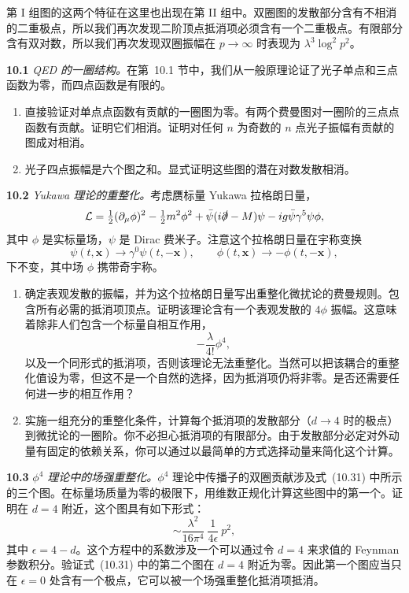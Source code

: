 第 I 组图的这两个特征在这里也出现在第 II 组中。双圈图的发散部分含有不相消的二重极点，所以我们再次发现二阶顶点抵消项必须含有一个二重极点。有限部分含有双对数，所以我们再次发现双圈振幅在 $p\to\infty$ 时表现为 $\lambda^3\log^2 p^2$。

\problems

\textbf{10.1} \emph{QED 的一圈结构。}在第~10.1 节中，我们从一般原理论证了光子单点和三点函数为零，而四点函数是有限的。
\begin{enumerate}[label=(\alph*)]
  \item 直接验证对单点点函数有贡献的一圈图为零。有两个费曼图对一圈阶的三点点函数有贡献。证明它们相消。证明对任何 $n$ 为奇数的 $n$ 点光子振幅有贡献的图成对相消。
  \item 光子四点振幅是六个图之和。显式证明这些图的潜在对数发散相消。
\end{enumerate}

\textbf{10.2} \emph{Yukawa 理论的重整化。}考虑赝标量 Yukawa 拉格朗日量，
\begin{equation}
  \mathcal{L} = \tfrac{1}{2}(\partial_\mu\phi)^2 - \tfrac{1}{2}m^2\phi^2
    + \bar{\psi}(i\slashed{\partial} - M)\psi - ig\bar{\psi}\gamma^5\psi\phi ,
\end{equation}
其中 $\phi$ 是实标量场，$\psi$ 是 Dirac 费米子。注意这个拉格朗日量在宇称变换
\begin{equation}
  \psi(t,\mathbf{x}) \to \gamma^0\psi(t,-\mathbf{x}),\qquad
  \phi(t,\mathbf{x}) \to -\phi(t,-\mathbf{x}),
\end{equation}
下不变，其中场 $\phi$ 携带奇宇称。
\begin{enumerate}[label=(\alph*)]
  \item 确定表观发散的振幅，并为这个拉格朗日量写出重整化微扰论的费曼规则。包含所有必需的抵消项顶点。证明该理论含有一个表观发散的 $4\phi$ 振幅。这意味着除非人们包含一个标量自相互作用，
    \begin{equation}
      -\frac{\lambda}{4!}\phi^4 ,
    \end{equation}
    以及一个同形式的抵消项，否则该理论无法重整化。当然可以把该耦合的重整化值设为零，但这不是一个自然的选择，因为抵消项仍将非零。是否还需要任何进一步的相互作用？
  \item 实施一组充分的重整化条件，计算每个抵消项的发散部分（$d\to 4$ 时的极点）到微扰论的一圈阶。你不必担心抵消项的有限部分。由于发散部分必定对外动量有固定的依赖关系，你可以通过以最简单的方式选择动量来简化这个计算。
\end{enumerate}

\textbf{10.3} \emph{$\phi^4$ 理论中的场强重整化。}$\phi^4$ 理论中传播子的双圈贡献涉及式~(10.31) 中所示的三个图。在标量场质量为零的极限下，用维数正规化计算这些图中的第一个。证明在 $d = 4$ 附近，这个图具有如下形式：
\begin{equation}
  \sim \frac{\lambda^2}{16\pi^4}\ \frac{1}{4\epsilon}\ p^2 ,
\end{equation}
其中 $\epsilon = 4-d$。这个方程中的系数涉及一个可以通过令 $d = 4$ 来求值的 Feynman 参数积分。验证式~(10.31) 中的第二个图在 $d = 4$ 附近为零。因此第一个图应当只在 $\epsilon = 0$ 处含有一个极点，它可以被一个场强重整化抵消项抵消。

